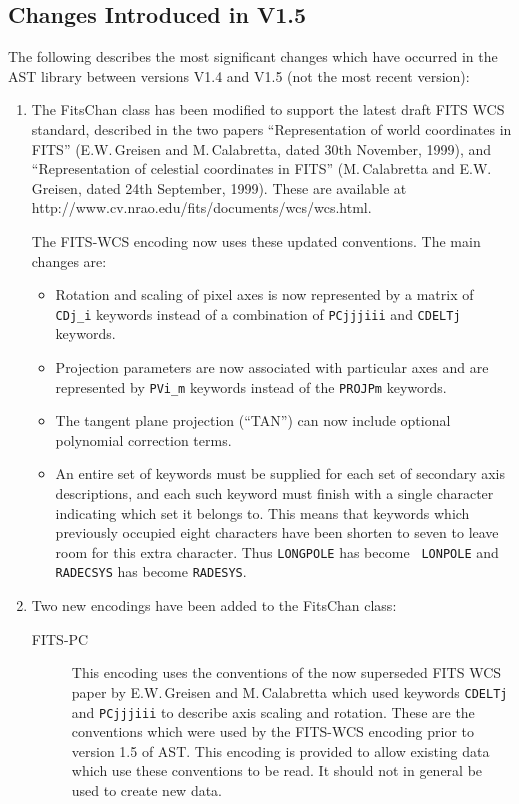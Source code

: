 \documentclass[twoside,11pt]{article}
\newcommand{\htmladdnormallink}[2]{#1}
\begin{document}
\subsection{Changes Introduced in V1.5}

The following describes the most significant changes which have
occurred in the AST library between versions V1.4 and V1.5 (not the most
recent version):

\begin{enumerate}

\item The FitsChan class has been modified to support the latest draft
FITS WCS standard, described in the two papers ``Representation of world
coordinates in FITS'' (E.W.\,Greisen and M.\,Calabretta, dated 30th
November, 1999), and ``Representation of celestial coordinates in FITS''
(M.\,Calabretta and E.W.\,Greisen, dated 24th September, 1999). These are
available at
\htmladdnormallink{http://www.cv.nrao.edu/fits/documents/wcs/wcs.html}
{http://www.cv.nrao.edu/fits/documents/wcs/wcs.html}.

The FITS-WCS encoding now uses these updated conventions. The main
changes are:

\begin{itemize}
\item Rotation and scaling of pixel axes is now represented by a matrix
of {\tt CDj\_i} keywords instead of a combination of {\tt PCjjjiii} and
{\tt CDELTj} keywords.
\item Projection parameters are now associated with particular axes and
are represented by {\tt PVi\_m} keywords instead of the {\tt PROJPm}
keywords.
\item The tangent plane projection (``TAN'') can now include optional
polynomial correction terms.
\item An entire set of keywords must be supplied for each set of secondary
axis descriptions, and each such keyword must finish with a single
character indicating which set it belongs to. This means that keywords
which previously occupied eight characters have been shorten to seven to
leave room for this extra character. Thus {\tt LONGPOLE} has become {\tt
LONPOLE} and {\tt RADECSYS} has become {\tt RADESYS}.
\end{itemize}

\item Two new encodings have been added to the FitsChan class:
\begin{description}

\item [FITS-PC] This encoding uses the conventions of the now superseded
FITS WCS paper by E.W.\,Greisen and M.\,Calabretta which used keywords
{\tt CDELTj} and {\tt PCjjjiii} to describe axis scaling and rotation.
These are the conventions which were used by the FITS-WCS encoding prior
to version 1.5 of AST. This encoding is provided to allow existing data
which use these conventions to be read. It should not in general be used
to create new data.


\end{description}
\end{enumerate}
\end{document}

